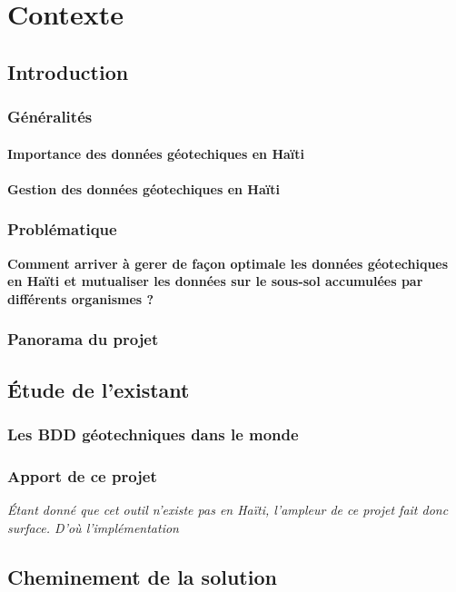 \chapter{Contexte}
\section{Introduction}
    \subsection{Généralités}
        \subsubsection{Importance des données géotechiques en Haïti}
          
        \subsubsection{Gestion des données géotechiques en Haïti}
            

    \subsection{Problématique}
    \textbf{Comment arriver à gerer de façon optimale les données géo\-techiques en Haïti et 
    mutualiser les données sur le sous-sol accumulées par différents organismes ?}
    \subsection{Panorama du projet}
        

\section{Étude de l'existant}
    \subsection{Les BDD géotechniques dans le monde}
    \subsection{Apport de ce projet}
    \textit{Étant donné que cet outil n'existe pas 
    en Haïti, l'ampleur de ce projet fait donc surface.
    D'où l'implémentation}

\section{Cheminement de la solution}

